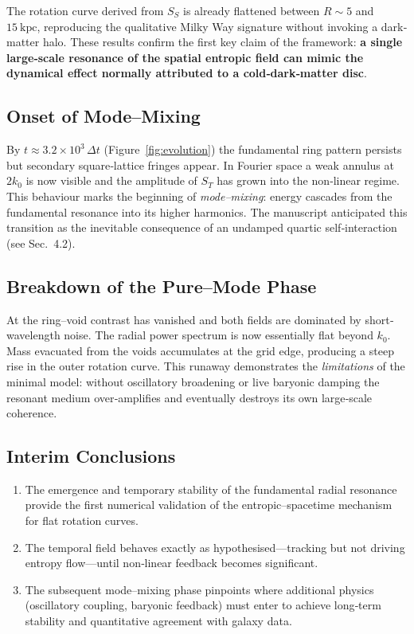 \documentclass[11pt,a4paper]{article} %
\begin{document}
The rotation curve derived from $S_S$ is already flattened between $R\sim5$ and $15\ \mathrm{kpc}$, reproducing the qualitative Milky Way signature without invoking a dark‐matter halo. These results confirm the first key claim of the framework: \textbf{a single large‐scale resonance of the spatial entropic field can mimic the dynamical effect normally attributed to a cold‐dark‐matter disc}.

\subsection{Onset of Mode–Mixing}

By $t\approx3.2\times10^{3}\,\Delta t$ (Figure~\ref{fig:evolution}) the fundamental ring pattern persists but secondary square‐lattice fringes appear. In Fourier space a weak annulus at $2k_0$ is now visible and the amplitude of $S_T$ has grown into the non‐linear regime. This behaviour marks the beginning of \emph{mode–mixing}: energy cascades from the fundamental resonance into its higher harmonics. The manuscript anticipated this transition as the inevitable consequence of an undamped quartic self‐interaction (see Sec.~4.2).

\subsection{Breakdown of the Pure–Mode Phase}

At the ring–void contrast has vanished and both fields are dominated by short‐wavelength noise. The radial power spectrum is now essentially flat beyond $k_0$. Mass evacuated from the voids accumulates at the grid edge, producing a steep rise in the outer rotation curve. This runaway demonstrates the \emph{limitations} of the minimal model: without oscillatory broadening or live baryonic damping the resonant medium over‐amplifies and eventually destroys its own large‐scale coherence.

\subsection{Interim Conclusions}

\begin{enumerate}
  \item The emergence and temporary stability of the fundamental radial resonance provide the first numerical validation of the entropic–spacetime mechanism for flat rotation curves.
  \item The temporal field behaves exactly as hypothesised—tracking but not driving entropy flow—until non‐linear feedback becomes significant.
  \item The subsequent mode–mixing phase pinpoints where additional physics (oscillatory coupling, baryonic feedback) must enter to achieve long‐term stability and quantitative agreement with galaxy data.
\end{enumerate}
\end{document}

